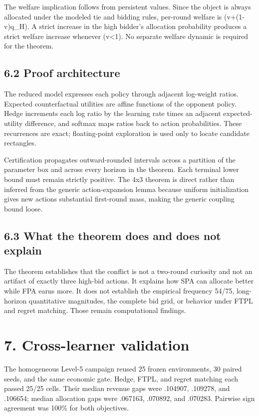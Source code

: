 \documentclass[11pt]{article}
\begin{document}
The welfare implication follows from persistent values. Since the object is always allocated under the modeled tie and bidding rules, per-round welfare is (v+(1-v)q_H). A strict increase in the high bidder's allocation probability produces a strict welfare increase whenever (v<1). No separate welfare dynamic is required for the theorem.

\subsection{6.2 Proof architecture}
The reduced model expresses each policy through adjacent log-weight ratios. Expected counterfactual utilities are affine functions of the opponent policy. Hedge increments each log ratio by the learning rate times an adjacent expected-utility difference, and softmax maps ratios back to action probabilities. These recurrences are exact; floating-point exploration is used only to locate candidate rectangles.

Certification propagates outward-rounded intervals across a partition of the parameter box and across every horizon in the theorem. Each terminal lower bound must remain strictly positive. The 4x3 theorem is direct rather than inferred from the generic action-expansion lemma because uniform initialization gives new actions substantial first-round mass, making the generic coupling bound loose.

\subsection{6.3 What the theorem does and does not explain}
The theorem establishes that the conflict is not a two-round curiosity and not an artifact of exactly three high-bid actions. It explains how SPA can allocate better while FPA earns more. It does not establish the empirical frequency 54/75, long-horizon quantitative magnitudes, the complete bid grid, or behavior under FTPL and regret matching. Those remain computational findings.

\section{7. Cross-learner validation}
The homogeneous Level-5 campaign reused 25 frozen environments, 30 paired seeds, and the same economic gate. Hedge, FTPL, and regret matching each passed 25/25 cells. Their median revenue gaps were .104907, .109278, and .106654; median allocation gaps were .067163, .070892, and .070283. Pairwise sign agreement was 100\% for both objectives.
\end{document}
